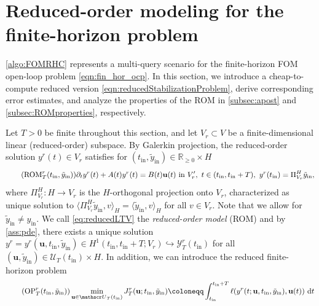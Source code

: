 \documentclass{m2an}
\def\R{\mathbb{R}}
\newcommand{\ddt}{\partial_t}
\newcommand{\bu}{\mathbf{u}}
\newcommand{\dt}{\mathrm{d}t}
\newcommand{\reduce}[1]{{{#1}^r}}
\newcommand{\tint}{t_{\mathrm{in}}}
\newcommand{\yint}{y_{\mathrm{in}}}
\newcommand{\tildeyint}{\tilde y_{\mathrm{in}}}
\newcommand{\mU}{{\mathscr U}}
\newcommand{\mY}{{\mathscr Y}}
\begin{document}
\section{Reduced-order modeling for the finite-horizon problem}\label{sec:ROM}
%
\cref{algo:FOMRHC} represents a multi-query scenario for the finite-horizon FOM open-loop problem \eqref{eqn:fin_hor_ocp}. In this section, we introduce a cheap-to-compute reduced version \eqref{eqn:reducedStabilizationProblem}, derive corresponding error estimates, and analyze the properties of the ROM in \cref{subsec:apost} and \cref{subsec:ROMproperties}, respectively.

Let $T>0$ be finite throughout this section, and let $V_r\subset V$ be a finite-dimensional linear (reduced-order) subspace. By Galerkin projection, the reduced-order solution $\reduce{y}(t)\in V_r$ satisfies for $(\tint,\tildeyint)\in\R_{\ge0}\times H$
%
\begin{equation}
    \label{eq:reducedLTV}
    \tag{$\text{ROM}^r_{T}(\tint, \tildeyint)$}
     \ddt {\reduce {y}}(t)+A(t){{\reduce {y}}}(t)= {B}(t)\bu(t)\ \text{in } V_r', \ t \in  ( \tint,\tint+T),\ 
           \reduce{y}(\tint)
           =\Pi^H_{V_r} \tildeyint,
\end{equation}
%
where $\Pi^H_{V_r}:H\to V_r$ is the $H$-orthogonal projection onto $V_r$, characterized as unique solution to $\langle\Pi^H_{V_r}\tildeyint,v\rangle_H=\langle \tildeyint ,v\rangle_H$ for all $v\in V_r$. Note that we allow for $\tildeyint \neq \yint$. 
We call \eqref{eq:reducedLTV} the \emph{reduced-order model} (ROM) and by \cref{ass:pde}, there exists a unique solution $\reduce{y}=y^r(\bu,\tint,\tildeyint)\in H^1(\tint,\tint+T;V_r)\hookrightarrow \mY_T^r(\tint)$ for all $(\bu,\tildeyint)\in \mU_T(\tint)\times H$.
%
In addition, we can introduce the reduced finite-horizon problem
%
\begin{equation}
    \label{eqn:reducedStabilizationProblem}
    \tag{$\text{OP}^r_{T}(\tint,\tildeyint)$}
    \min\limits_{\bu\in\mU_T(\tint)} J_T^r(\bu;\tint,\tildeyint)\coloneqq\int^{\tint+T}_{\tint} \ell(y^r(t;\bu,\tint,\tildeyint),\bu(t))\ \dt
\end{equation}
\end{document}

